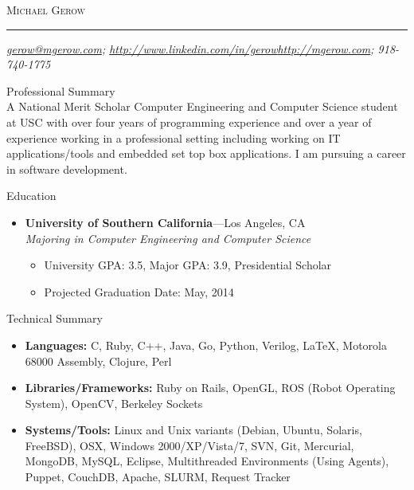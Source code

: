 \documentclass[8pt,oneside]{article}
\makeatletter
\newcommand{\name}{Michael Gerow}
\newcommand{\phone}{918-740-1775}
\newcommand{\email}{\href{mailto:gerow@mgerow.com?subject=Hello}{gerow@mgerow.com}}
\newcommand{\linkedin}{\href{http://www.linkedin.com/in/gerow}{http://www.linkedin.com/in/gerow}}
\newcommand{\website}{\href{http://mgerow.com}{http://mgerow.com}}
\newcommand{\bigname}[1]{
	\begin{center}\fontfamily{phv}\selectfont\Large\scshape#1\end{center}
}
\newenvironment{ressection}[1]{
	\vspace{4pt}
	{\fontfamily{phv}\selectfont\large#1}
	\begin{itemize}
	\vspace{3pt}
}{
	\end{itemize}
}
\newcommand{\resplainsection}[1]{
	{\fontfamily{phv}\selectfont\large#1}
	\vspace{-12pt}
	\\

}
\newcommand{\resitem}[1]{
	\vspace{-4pt}
	\item \begin{flushleft} #1 \end{flushleft}
}
\newcommand{\ressubitem}[1]{
	\vspace{-1pt}
	\item \begin{flushleft} #1 \end{flushleft}
}
\newcommand{\resbigitem}[3]{
	\vspace{-5pt}
	\item
	\textbf{#1}---#2 \\
	\textit{#3}
}
\newenvironment{ressubsec}[3]{
	\resbigitem{#1}{#2}{#3}
	\vspace{-2pt}
	\begin{itemize}
}{
	\end{itemize}
}
\makeatother
\begin{document}
 \selectfont

\bigname{\name}

\vspace{-8pt} \rule{\textwidth}{1pt}

\vspace{-1pt} {\small\itshape \email; \linkedin \hfill \website; \phone}

\vspace{8 pt}


\resplainsection{Professional Summary}
	A National Merit Scholar Computer Engineering and Computer Science student at USC with over four years of programming experience and over a year of experience working in a professional setting including working on IT applications/tools and embedded set top box applications. I am pursuing a career in software development.

\begin{ressection}{Education}

	\begin{ressubsec}{University of Southern California}{Los Angeles, CA}{Majoring in Computer Engineering and Computer Science}
		\ressubitem{University GPA:  3.5, Major GPA: 3.9, Presidential Scholar}
		\ressubitem{Projected Graduation Date:  May, 2014}
	\end{ressubsec}

\end{ressection}

\begin{ressection}{Technical Summary}

	\resitem{\textbf{Languages:} C, Ruby, C++, Java, Go, Python, Verilog, \LaTeX, Motorola 68000 Assembly, Clojure, Perl}
	\resitem{\textbf{Libraries/Frameworks:} Ruby on Rails, OpenGL, ROS (Robot Operating System), OpenCV, Berkeley Sockets }
	\resitem{\textbf{Systems/Tools:} Linux and Unix variants (Debian, Ubuntu, Solaris, FreeBSD), OSX, Windows 2000/XP/Vista/7, SVN, Git, Mercurial, MongoDB, MySQL, Eclipse, Multithreaded Environments (Using Agents), Puppet, CouchDB, Apache, SLURM, Request Tracker}
	
\end{ressection}


\end{document}
